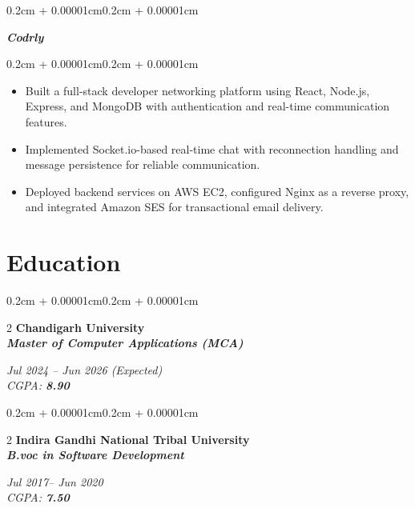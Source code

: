 \documentclass[10pt, letterpaper]{article}
\newenvironment{highlights}{
    \begin{itemize}[
        topsep=0.10cm,
        parsep=0.10cm,
        partopsep=0pt,
        itemsep=0pt,
        leftmargin=0.4cm + 10pt
    ]
}{
    \end{itemize}
}
\newenvironment{onecolentry}{
    \begin{adjustwidth}{0.2cm + 0.00001cm}{0.2cm + 0.00001cm}
}{
    \end{adjustwidth}
}
\newenvironment{twocolentry}[2][]{
    \onecolentry
    \def\secondColumn{#2}
    \setcolumnwidth{\fill, 4.5cm}
    \begin{paracol}{2}
}{
    \switchcolumn \raggedleft \secondColumn
    \end{paracol}
    \endonecolentry
}
\begin{document}
\begin{onecolentry}
    \textbf{\textit{Codrly}}
\end{onecolentry}

\begin{onecolentry}
\begin{highlights}
        \item Built a full-stack developer networking platform using React, Node.js, Express, and MongoDB with authentication and real-time communication features.
    
        \item Implemented Socket.io-based real-time chat with reconnection handling and message persistence for reliable communication.
        
         \item Deployed backend services on AWS EC2, configured Nginx as a reverse proxy, and integrated Amazon SES for transactional email delivery.


\end{highlights}
\end{onecolentry}



\vspace{0.05cm}


\section{Education}

\begin{twocolentry}{
    \textit{Jul 2024 – Jun 2026 (Expected)} \\
    \textit{CGPA: \textbf{8.90}}
}{
    \textbf{Chandigarh University} \\
    \textbf{\textit{Master of Computer Applications (MCA)}}
}
\end{twocolentry}
\vspace{0.2cm}
\begin{twocolentry}{
    \textit{Jul 2017– Jun 2020} \\
    \textit{CGPA: \textbf{7.50}}
}{
    \textbf{Indira Gandhi National Tribal University} \\
    \textbf{\textit{B.voc in Software Development}}
}
\end{twocolentry}
\end{document}
